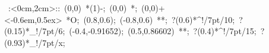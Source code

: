 %


\hbox{
\xy    <2cm,0cm>:<0cm,2cm>::
       (0,0) *\ellipse(1){-}; 
       (0,0) *{\bullet}; (0,0)+<-0.6em,0.5ex> *{O};
       (0.8,0.6); (-0.8,0.6) **\dir{-}; ?(0.6)*^!/7pt/{10}; ?(0.15)*_!/7pt/{6};
       (-0.4,-0.91652); (0.5,0.86602) **\dir{-}; ?(0.4)*^!/7pt/{15}; ?(0.93)*_!/7pt/{x};
\endxy}

